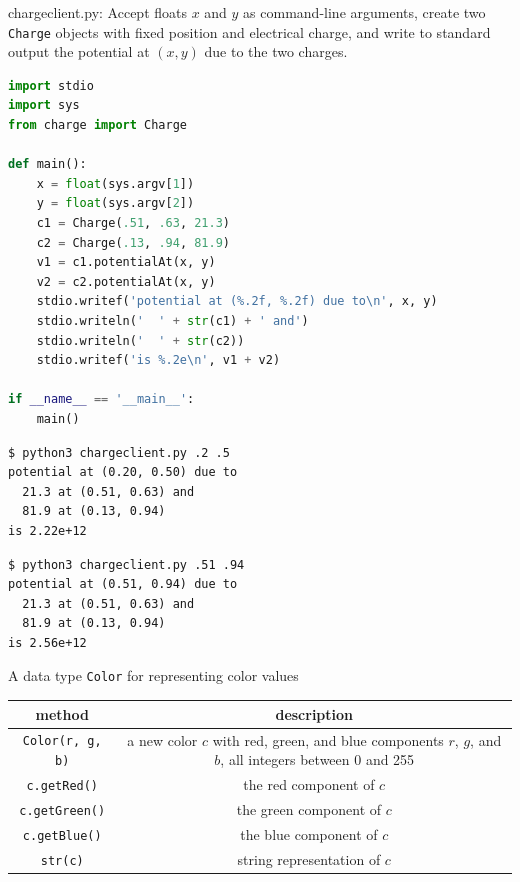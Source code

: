 \documentclass[8pt,a4paper,compress]{beamer}
\begin{document}
\begin{frame}[fragile]
\pause

\begin{framed}
\tiny chargeclient.py: Accept floats $x$ and $y$ as command-line arguments, create two \lstinline{Charge} objects with fixed position and electrical charge, and write to standard output the potential at $(x, y)$ due to the two charges.
\end{framed}

\begin{lstlisting}[language=Python,style=focusin]
import stdio
import sys
from charge import Charge

def main():
    x = float(sys.argv[1])
    y = float(sys.argv[2])
    c1 = Charge(.51, .63, 21.3)
    c2 = Charge(.13, .94, 81.9)
    v1 = c1.potentialAt(x, y)
    v2 = c2.potentialAt(x, y)
    stdio.writef('potential at (%.2f, %.2f) due to\n', x, y)
    stdio.writeln('  ' + str(c1) + ' and')
    stdio.writeln('  ' + str(c2))
    stdio.writef('is %.2e\n', v1 + v2)

if __name__ == '__main__':
    main()
\end{lstlisting}

\pause
\bigskip

\begin{lstlisting}[language={},style=focusin]
$ python3 chargeclient.py .2 .5
potential at (0.20, 0.50) due to
  21.3 at (0.51, 0.63) and
  81.9 at (0.13, 0.94)
is 2.22e+12
\end{lstlisting}

\pause
\smallskip

\begin{lstlisting}[language={},style=focusin]
$ python3 chargeclient.py .51 .94
potential at (0.51, 0.94) due to
  21.3 at (0.51, 0.63) and
  81.9 at (0.13, 0.94)
is 2.56e+12
\end{lstlisting}
\end{frame}

\begin{frame}[fragile]
\pause

A data type \lstinline{Color} for representing color values
\begin{center}
\begin{tabular}{cc}
method & description \\ \hline
\lstinline$Color(r, g, b)$ & \makecell{a new color $c$ with red, green, and blue components \\ $r$, $g$, and $b$, all integers between 0 and 255} \\
\lstinline$c.getRed()$ & the red component of $c$ \\
\lstinline$c.getGreen()$ & the green component of $c$ \\
\lstinline$c.getBlue()$ & the blue component of $c$ \\
\lstinline$str(c)$ & string representation of $c$
\end{tabular} 
\end{center}
\end{frame}
\end{document}
